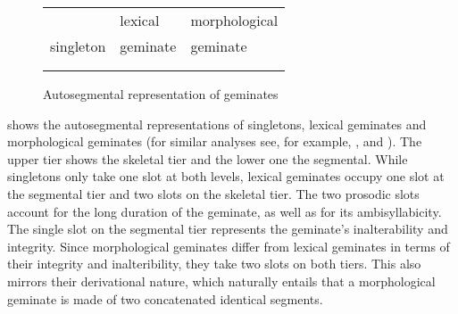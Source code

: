\begin{figure}[h]
	\centering	
	
	\begin{tabularx}{.8\linewidth}{YYY}
		
		&		lexical			 & 		 morphological \\
		
		singleton	&			  geminate	 & 			  geminate\\		
		\\

		\begin{tikzpicture}[grow'=up]
		\Tree [.C C ] 					
		\end{tikzpicture}												&
		
		
		\begin{tikzpicture}[grow'=up]
		\Tree  [.C C C ];
		\end{tikzpicture}			
		&
		
		\begin{tikzpicture}[grow'=up]
		\Tree  [.C C ]
		\end{tikzpicture}
		\begin{tikzpicture}[grow'=up]
		\Tree  [.C C ]
		\end{tikzpicture}		
	\end{tabularx}
	
	\caption{Autosegmental representation of geminates}
	 \label{fig:Autosegmental representation of geminates} 

\end{figure}

 shows the autosegmental representations of singletons,  lexical geminates and  morphological geminates (for similar analyses see, for example,  \citealt[413]{Kenstowicz.1994}, \citealt[26f.]{Gussmann.2002} and \citealt[62]{Ridouane.2010}). The upper tier shows the skeletal tier and the lower one the segmental. While singletons only take one slot at both levels,  lexical geminates occupy one slot at the segmental tier and two slots on the skeletal tier. The two prosodic slots account for the long duration of the geminate, as well as for its ambisyllabicity. The single slot on the segmental tier represents the {geminate's} inalterability and integrity. Since  morphological geminates differ from  lexical geminates in terms of their integrity and inalteribility, they take two slots on both tiers. This also mirrors their derivational nature, which naturally entails that a {morphological geminate} is made of two concatenated identical segments.


